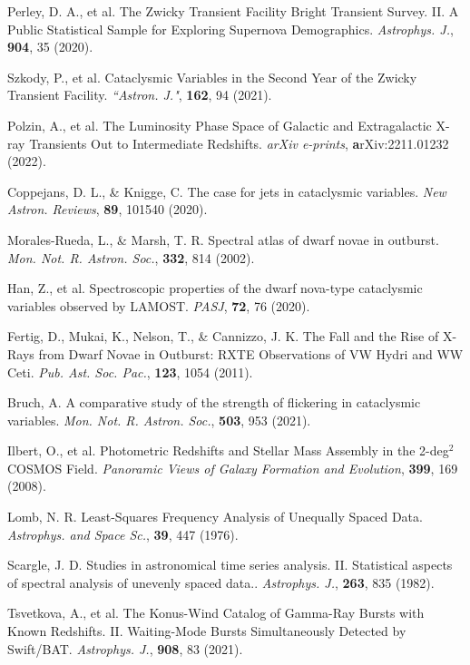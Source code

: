 \documentclass{nature_plusfigure}
\newcommand{\mn}{{Mon. Not. R. Astron. Soc.}}
\newcommand{\nar}{{New Astron. Reviews}}
\newcommand{\mnras}{\mn}
\newcommand{\aj}{{``Astron. J."}}
\newcommand{\apj}{{Astrophys. J.}}
\newcommand{\apss}{{Astrophys. and Space Sc.}}
\newcommand{\pasj}{{PASJ}}
\newcommand{\pasp}{{Pub. Ast. Soc. Pac.}}
\begin{document}
\begin{methods}
\begin{thebibliography}{10}
 Perley, D. A., et al. The Zwicky Transient Facility Bright Transient Survey. II. A Public Statistical Sample for Exploring Supernova Demographics. \emph{\apj}, \textbf{904}, 35 (2020). 

 Szkody, P., et al. Cataclysmic Variables in the Second Year of the Zwicky Transient Facility. \emph{\aj}, \textbf{162}, 94 (2021). 

 Polzin, A., et al. The Luminosity Phase Space of Galactic and Extragalactic X-ray Transients Out to Intermediate Redshifts. \emph{arXiv e-prints}, \textbf arXiv:2211.01232 (2022). 

 Coppejans, D. L., \& Knigge, C. The case for jets in cataclysmic variables. \emph{\nar}, \textbf{89}, 101540 (2020). 

 Morales-Rueda, L., \& Marsh, T. R. Spectral atlas of dwarf novae in outburst. \emph{\mnras}, \textbf{332}, 814 (2002). 

 Han, Z., et al. Spectroscopic properties of the dwarf nova-type cataclysmic variables observed by LAMOST. \emph{\pasj}, \textbf{72}, 76 (2020). 

 Fertig, D., Mukai, K., Nelson, T., \& Cannizzo, J. K. The Fall and the Rise of X-Rays from Dwarf Novae in Outburst: RXTE Observations of VW Hydri and WW Ceti. \emph{\pasp}, \textbf{123}, 1054 (2011). 

 Bruch, A. A comparative study of the strength of flickering in cataclysmic variables. \emph{\mnras}, \textbf{503}, 953 (2021). 

 Ilbert, O., et al. Photometric Redshifts and Stellar Mass Assembly in the 2-deg$^2$ COSMOS Field. \emph{Panoramic Views of Galaxy Formation and Evolution}, \textbf{399}, 169 (2008). 


 Lomb, N. R. Least-Squares Frequency Analysis of Unequally Spaced Data. \emph{\apss}, \textbf{39}, 447 (1976). 

 Scargle, J. D. Studies in astronomical time series analysis. II. Statistical aspects of spectral analysis of unevenly spaced data.. \emph{\apj}, \textbf{263}, 835 (1982). 


 Tsvetkova, A., et al. The Konus-Wind Catalog of Gamma-Ray Bursts with Known Redshifts. II. Waiting-Mode Bursts Simultaneously Detected by Swift/BAT. \emph{\apj}, \textbf{908}, 83 (2021). 


\end{thebibliography}
\end{methods}
\end{document}
